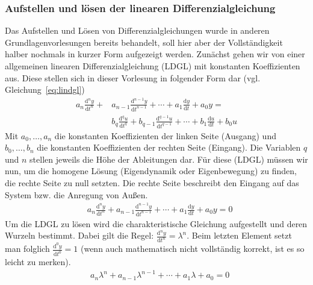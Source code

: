 \subsubsection{Aufstellen und lösen der linearen Differenzialgleichung}
%
Das Aufstellen und Lösen von Differenzialgleichungen wurde in anderen Grundlagenvorlesungen bereits behandelt, soll hier aber der Vollständigkeit halber nochmals in kurzer Form aufgezeigt werden. Zunächst gehen wir von einer allgemeinen linearen Differenzialgleichung (LDGL) mit konstanten Koeffizienten aus. Diese stellen sich in dieser Vorlesung in folgender Form dar (vgl. Gleichung~\ref{eq:lindgl})
%
\begin{equation}
\begin{aligned}
a_{n}\frac{\text{d}^{n}y}{\text{d}t^{n}}+&a_{n-1}\frac{\text{d}^{n-1}y}{\text{d}t^{n-1}}+\cdots+a_{1}\frac{\text{d}y}{\text{d}t}+a_{0}y=\\
&b_{q}\frac{\text{d}^{q}u}{\text{d}t^{q}}+b_{q-1}\frac{\text{d}^{q-1}u}{\text{d}t^{q-1}}+\cdots+b_{1}\frac{\text{d}u}{\text{d}t}+b_{0}u\label{eq:lindgl}
\end{aligned}
\end{equation}
%
Mit ${a_{0},\dots,a_{n}}$ die konstanten Koeffizienten der linken Seite (Ausgang) und ${b_{0},\dots,b_{n}}$ die konstanten Koeffizienten der rechten Seite (Eingang). Die Variablen $q$ und $n$ stellen jeweils die Höhe der Ableitungen dar. Für diese (LDGL) müssen wir nun, um die homogene Lösung (Eigendynamik oder Eigenbewegung) zu finden, die rechte Seite zu null setzten. Die rechte Seite beschreibt den Eingang auf das System bzw. die Anregung von Außen. 
%
\begin{equation}
\begin{aligned}
&a_{n}\frac{\text{d}^{n}y}{\text{d}t^{n}}+a_{n-1}\frac{\text{d}^{n-1}y}{\text{d}t^{n-1}}+\cdots+a_{1}\frac{\text{d}y}{\text{d}t}+a_{0}y=0 \label{eq:homdgl}
\end{aligned}
\end{equation}
%
Um die LDGL zu lösen wird die charakteristische Gleichung aufgestellt und deren Wurzeln bestimmt. Dabei gilt die Regel: $\frac{\text{d}^{n}y}{\text{d}t^{n}}=\lambda^{n}$. Beim letzten Element setzt man folglich $\frac{\text{d}^{0}y}{\text{d}t^{0}}=1$ (wenn auch mathematisch nicht vollständig korrekt, ist es so leicht zu merken).
%
\begin{equation}
\begin{aligned}
&a_{n}\lambda^{n}+a_{n-1}\lambda^{n-1}+\cdots+a_{1}\lambda+a_{0}=0 \label{eq:characterrischegl}
\end{aligned}
\end{equation}
